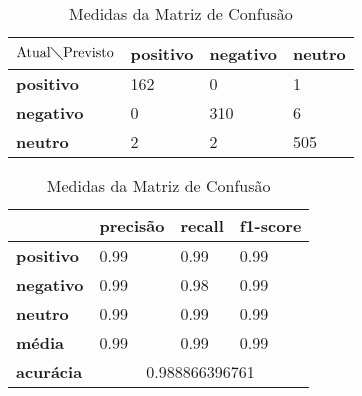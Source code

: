 \begin{table}[h!]
\centering
\begin{minipage}[b]{0.45\linewidth}
\caption{Matriz de Confusão Ternário: \textit{Decision Tree}}
\label{tab:mcb-nb}
\begin{tabular}{|l|l|l|l|}
\hline
$\textrm{Atual}\diagdown\textrm{Previsto}$ & \textbf{positivo} & \textbf{negativo} & \textbf{neutro}\\ \hline
\textbf{positivo} & 162 & 0 & 1\\ \hline
\textbf{negativo} & 0 & 310 & 6\\ \hline
\textbf{neutro} & 2 & 2 & 505\\ \hline
\end{tabular}
\end{minipage}
\hspace{0.5cm}
\begin{minipage}[b]{0.45\linewidth}

\centering
\caption{Medidas da Matriz de Confusão}
\label{tab:mmcb-nb}
\begin{tabular}{|l|l|l|l|}
\hline
         & \textbf{precisão} & \textbf{recall} & \textbf{f1-score} \\ \hline
\textbf{positivo} & 0.99     & 0.99   & 0.99     \\ \hline
\textbf{negativo} & 0.99     & 0.98   & 0.99     \\ \hline
\textbf{neutro} & 0.99     & 0.99   & 0.99     \\ \hline
\textbf{média} & 0.99     & 0.99   & 0.99     \\ \hline
\textbf{acurácia} & \multicolumn{3}{|c|}{0.988866396761}\\ \hline
\end{tabular}
\end{minipage}
\end{table}

